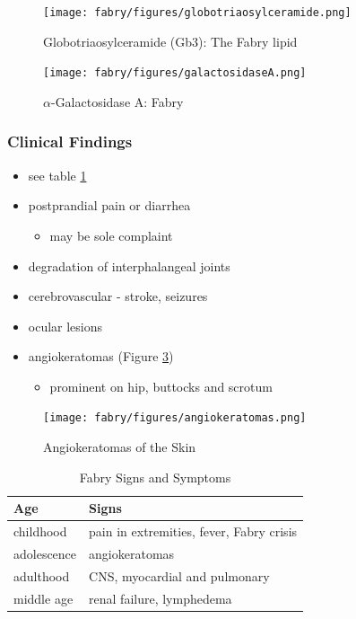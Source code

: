 \documentclass[12pt]{scrartcl}
\begin{document}
\begin{figure}[htbp]
\centering
\texttt{[image: fabry/figures/globotriaosylceramide.png]}
\caption[Globotriaosylceramide]{\label{fig:orgdbeeb7a}Globotriaosylceramide (Gb3): The Fabry lipid}
\end{figure}

\begin{figure}[htbp]
\centering
\texttt{[image: fabry/figures/galactosidaseA.png]}
\caption[\(\alpha\)-galactosidase A]{\label{fig:org3b4d00d}\(\alpha\)-Galactosidase A: Fabry}
\end{figure}


\subsubsection{Clinical Findings}
\label{sec:org1cf1c6c}
\begin{itemize}
\item see table \ref{tab:orgf01eec1}
\item postprandial pain or diarrhea
\begin{itemize}
\item may be sole complaint
\end{itemize}
\item degradation of interphalangeal joints
\item cerebrovascular - stroke, seizures
\item ocular lesions
\item angiokeratomas (Figure \ref{fig:orgd47a23e})
\begin{itemize}
\item prominent on hip, buttocks and scrotum
\end{itemize}
\end{itemize}

\begin{figure}[htbp]
\centering
\texttt{[image: fabry/figures/angiokeratomas.png]}
\caption[Angiokeratomas of the skin]{\label{fig:orgd47a23e}Angiokeratomas of the Skin}
\end{figure}

\begin{table}[htbp]
\caption{\label{tab:orgf01eec1}Fabry Signs and Symptoms}
\centering
\begin{tabular}{ll}
Age & Signs\\
\hline
childhood & pain in extremities, fever, Fabry crisis \footnotemark\\
adolescence & angiokeratomas\\
adulthood & CNS, myocardial and pulmonary\\
middle age & renal failure, lymphedema\\
\end{tabular}
\end{table}
\end{document}
